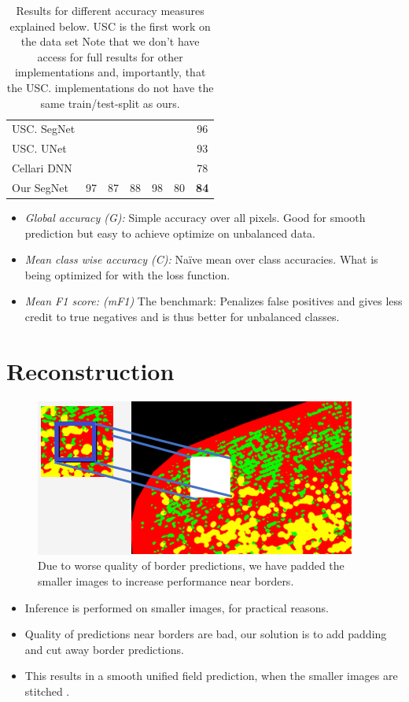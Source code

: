 \documentclass[
    ,title     = {{Image Segmentation for Smart Agriculture}}
    ,subject   = {{This is the subject of my work}}
    ,papersize = {{a1paper}}
    ,nocrop
]{dtuposter}
\begin{document}
\begin{dtupostercontent}
\begin{table}
\begin{tabular}{l|ccc|ccc|}
		\rule[-1ex]{0pt}{2.5ex} USC. SegNet    &    &  &  &  & &   96  \\ 
		\rule[-1ex]{0pt}{2.5ex} USC. UNet   &  &    &  &  & &93  \\ 
		\rule[-1ex]{0pt}{2.5ex} Cellari DNN   &    &  &  &  &  &78  \\ 
		\hline 
		\rule[-1ex]{0pt}{2.5ex} Our SegNet & 97 & 87  &88  & 98  &80&\textbf{84}  \\ 
	\end{tabular} 
\caption{Results for different accuracy measures explained below. USC is the first work on the data set \cite{USC.} Note that we don't have access for full results for other implementations and, importantly, that the USC. implementations do not have the same train/test-split as ours.}
\end{table}

\begin{itemize}
	\item \textit{Global accuracy (G):} Simple accuracy over all pixels. Good for smooth prediction but easy to achieve optimize on unbalanced data.
	\item \textit{Mean class wise accuracy (C):} Naïve mean over class accuracies. What is being optimized for with the loss function.
	\item \textit{Mean F1 score: (mF1)} The benchmark: Penalizes false positives and gives less credit to true negatives and is thus better for unbalanced classes. 
\end{itemize}

\section{Reconstruction}
\begin{figure}
	\centering
	\includegraphics[width=0.6\linewidth]{"Reconstruction DL"}
	\caption{Due to worse quality of border predictions, we have padded the smaller images to increase performance near borders.}
	\label{fig:reconstruction-dl}
\end{figure}
\begin{itemize}
	\item Inference is performed on smaller images, for practical reasons.
	\item Quality of predictions near borders are bad, our solution is to add padding and cut away border predictions.
	\item This results in a smooth unified field prediction, when the smaller images are stitched .
\end{itemize}


\end{dtupostercontent}
\end{document}
